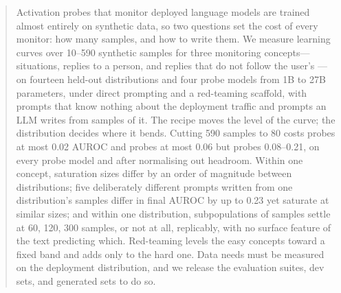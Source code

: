 \begin{abstract}
Activation probes that monitor deployed language models are trained almost
entirely on synthetic data, so two questions set the cost of every monitor:
how many samples, and how to write them. We measure learning curves over
10--590 synthetic samples for three monitoring concepts---\hs{} situations,
replies \harm{} to a person, and replies that do not follow the user's
\instr{}---on fourteen held-out distributions and four probe models from 1B to
27B parameters, under direct prompting and a red-teaming scaffold, with prompts
that know nothing about the deployment traffic and prompts an LLM writes from
samples of it. The recipe moves the level of the curve; the distribution
decides where it bends. Cutting 590 samples to 80 costs \hs{} probes at most
0.02 AUROC and \harm{} probes at most 0.06 but \instr{} probes 0.08--0.21, on
every probe model and after normalising out headroom. Within one concept,
saturation sizes differ by an order of magnitude between distributions; five
deliberately different prompts written from one distribution's samples differ
in final AUROC by up to 0.23 yet saturate at similar sizes; and within one
distribution, subpopulations of samples settle at 60, 120, 300 samples, or
not at all, replicably, with no surface feature of the text predicting which.
Red-teaming levels the easy concepts toward a fixed band and adds only to the
hard one. Data needs must be measured on the deployment distribution, and we
release the evaluation suites, dev sets, and generated sets to do so.
\end{abstract}
